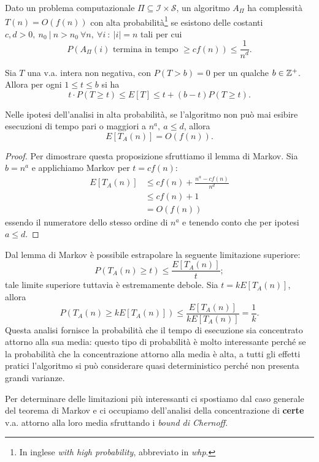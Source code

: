 \begin{definizione}
Dato un problema computazionale $\Pi \subseteq \mathcal{I}\times\mathcal{S}$, un algoritmo $A_{\Pi}$ ha complessità $T(n)=O(f(n))$ con alta probabilità\footnote{In inglese \textit{with high probability}, abbreviato in \textit{whp}.} se esistono delle costanti $c,d>0,\ n_0\ |\ n>n_0\ \forall n,\ \forall i\ :\ |i|=n$ tali per cui
\[
P(A_{\Pi}(i) \text{ termina in tempo } \geq cf(n)) \leq \frac{1}{n^d}.
\]
\end{definizione}

\begin{lemma}
\label{lemma:markov}
Sia $T$ una v.a. intera non negativa, con $P(T>b)=0$ per un qualche $b\in\operatorname*{\mathbb{Z}^+}$. Allora per ogni $1\leq t\leq b$ si ha
\[
t\cdot P(T\geq t) \leq E[T] \leq t+(b-t)P(T\geq t).
\]
\end{lemma}

\begin{proposizione}
Nelle ipotesi dell'analisi in alta probabilità, se l'algoritmo non può mai esibire esecuzioni di tempo pari o maggiori a $n^a,\ a\leq d$, allora
\[
E[T_A(n)]=O(f(n)).
\]
\end{proposizione}
\begin{proof}
Per dimostrare questa proposizione sfruttiamo il lemma di Markov. Sia $b=n^a$ e applichiamo Markov per $t=cf(n)$:
\begin{align*}
E[T_A(n)] &\leq cf(n) + \frac{n^a-cf(n)}{n^d} \\
&\leq cf(n)+1 \\
&=O(f(n))
\end{align*}
essendo il numeratore dello stesso ordine di $n^a$ e tenendo conto che per ipotesi $a\leq d$.
\end{proof}

Dal lemma di Markov è possibile estrapolare la seguente limitazione superiore:
\[
P(T_A(n)\geq t) \leq \frac{E[T_A(n)]}{t};
\]
tale limite superiore tuttavia è estremamente debole. Sia $t=kE[T_A(n)]$, allora
\[
P(T_A(n)\geq kE[T_A(n)]) \leq \frac{E[T_A(n)]}{kE[T_A(n)]} = \frac{1}{k}.
\]
Questa analisi fornisce la probabilità che il tempo di esecuzione sia concentrato attorno alla sua media: questo tipo di probabilità è molto interessante perché se la probabilità che la concentrazione attorno alla media è alta, a tutti gli effetti pratici l'algoritmo si può considerare quasi deterministico perché non presenta grandi varianze.

Per determinare delle limitazioni più interessanti ci spostiamo dal caso generale del teorema di Markov e ci occupiamo dell'analisi della concentrazione di \textbf{certe} v.a. attorno alla loro media sfruttando i \textit{bound di Chernoff}.

